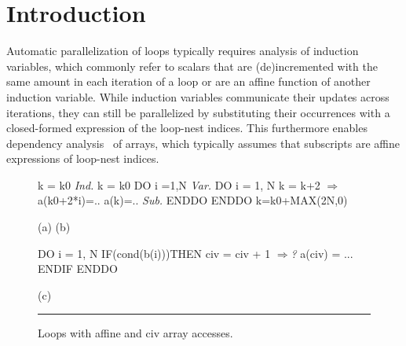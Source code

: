 \documentclass{sig-alternate}
\newcommand{\emp}[1]{\textcolor{DikuRed}{ #1}}
\newcommand{\emphh}[1]{\textcolor{CosGreen}{ #1}}
\newcommand{\mymath}[1]{$ #1 $}
\begin{document}





\section{Introduction}


\enlargethispage{\baselineskip}


Automatic parallelization of loops typically requires analysis of 
induction variables, which commonly refer to scalars that are 
(de)incremented with the same amount in each iteration of a loop or 
are an affine function of another induction variable. 
%
While induction variables communicate their updates across  %
iterations, they can still be parallelized by substituting their 
occurrences with a closed-formed expression of the loop-nest indices. 
%
This furthermore enables dependency analysis~\cite{BanerjeeIneqTest,FeautrierDataflow,Pugh92theomega} 
of arrays, which typically assumes that subscripts are affine 
expressions of loop-nest indices.
% 

\begin{figure}
\begin{minipage}{0.58\columnwidth}
\begin{colorcode}
k = k0     \emphh{\em Ind.}  k = k0        
DO i =1,N  \emphh{\em Var.}  DO i = 1, N      
  k = k+2    \emphh{\mymath{\Rightarrow}}    a(k0+2*i)=.. 
  a(k)=..  \emphh{\em Sub.}  ENDDO         
ENDDO            k=k0+MAX(2N,0)

   (a)               (b) 

\end{colorcode}
\end{minipage}
\begin{minipage}{0.35\columnwidth}
\begin{colorcode}
DO i = 1, N
 IF(cond(b(i)))THEN 
    civ = civ + 1 \emp{\mymath{\Rightarrow}{\em ?}} 
    a(civ) = ...
ENDIF ENDDO

      (c)

\end{colorcode}
\end{minipage}
\hrule
\caption{Loops with affine and {\sc civ} array accesses.}
\label{fig:introEg}
\vspace{-2ex}
\end{figure}
\end{document}
